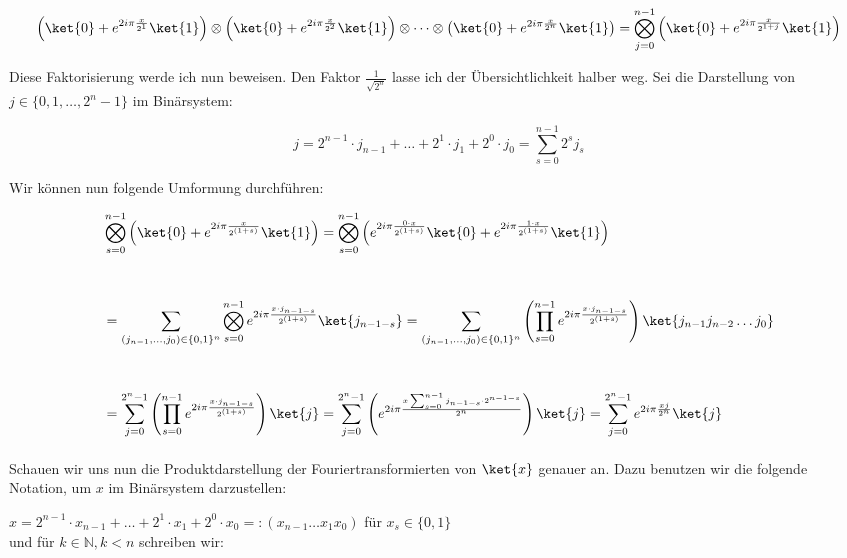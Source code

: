 \begin{align*}
    \left(\ket{0} + e^{2i\pi\frac{x}{2^{1}}}\ket{1}\right)\otimes\left(\ket{0} + e^{2i\pi\frac{x}{2^{2}}}\ket{1}\right)\otimes\cdots\otimes\left(\ket{0} + e^{2i\pi\frac{x}{2^{n}}}\ket{1}\right) = \bigotimes_{j = 0}^{n - 1}\left(\ket{0} + e^{2i\pi\frac{x}{2^{1 + j}}}\ket{1}\right)
\end{align*}

\noindent Diese Faktorisierung werde ich nun beweisen. Den Faktor $\frac{1}{\sqrt{2^n}}$ lasse ich der Übersichtlichkeit halber weg. Sei die Darstellung von $j \in \{0, 1, \dots, 2^n - 1\}$ im Binärsystem:

$$j=2^{n-1}\cdot j_{n-1}+\ldots + 2^1\cdot j_1+2^0\cdot j_0 = \sum_{s = 0}^{n - 1}2^sj_s$$

\noindent Wir können nun folgende Umformung durchführen:

\begin{align*}
&\bigotimes_{s = 0}^{n - 1}{\left( \ket{0} + e^{2i\pi\frac{x}{2^{(1 + s)}}}\ket{1} \right)} = \bigotimes_{s = 0}^{n - 1}{\left( e^{2i\pi\frac{0\cdot x}{2^{(1 + s)}}}\ket{0} + e^{2i\pi\frac{1 \cdot x}{2^{(1 + s)}}}\ket{1} \right)} \\[1cm] &= \sum_{(j_{n-1},\dots,j_0)\in \{0, 1\}^n}\bigotimes_{s = 0}^{n - 1}e^{2i\pi\frac{x\cdot j_{n - 1 - s}}{2^{(1 + s)}}}\ket{j_{n - 1 - s}} = \sum_{(j_{n-1},\dots,j_0)\in \{0, 1\}^n}\left( \prod_{s = 0}^{n - 1}e^{2i\pi\frac{x\cdot j_{n - 1 - s}}{2^{(1 + s)}}} \right)\ket{j_{n - 1}j_{n - 2}\dots j_0} \\[1cm] &= \sum_{j = 0}^{2^n - 1} \left( \prod_{s = 0}^{n - 1}e^{2i\pi\frac{x\cdot j_{n - 1 - s}}{2^{(1 + s)}}} \right) \ket{j} = \sum_{j = 0}^{2^n - 1}\left( e^{2i\pi\frac{x\sum_{s = 0}^{n - 1}{j_{n - 1 - s}\cdot 2^{n - 1 - s}}}{2^n}} \right)\ket{j} = \sum_{j = 0}^{2^n - 1}e^{2i\pi\frac{xj}{2^n}}\ket{j}
\end{align*}
\paragraph{}

\noindent Schauen wir uns nun die Produktdarstellung der Fouriertransformierten von $\ket{x}$ genauer an. Dazu benutzen wir die folgende Notation, um $x$ im Binärsystem darzustellen:

$x = 2^{n - 1}\cdot x_{n - 1} + \dots + 2^1 \cdot x_1 + 2^0 \cdot x_0 =: (x_{n - 1}\dots x_1x_0)$ \quad für $x_s \in \{0, 1\}$ \\
und für $k \in \mathbb{N}, k < n$ schreiben wir:

